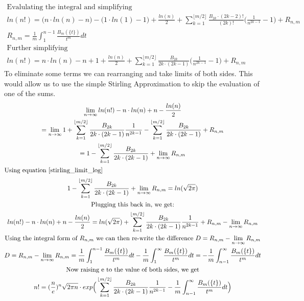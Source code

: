\documentclass[a4paper]{article}
\begin{document}
\begin{theorem}
\begin{gather*}
\\
\text{Evalulating the integral and simplifying}
\\
ln(n!) = \big(n \cdot ln(n) - n \big) - \big(1 \cdot ln(1) - 1 \big) +
\frac{ln(n)}{2} 
+ \sum_{k=1}^{\lfloor m/2 \rfloor} \frac{B_{2k} \cdot (2k-2)!}{(2k)!} \Big(\frac{1}{n^{2k-1}} - 1\Big) + R_{n,m}
\\
R_{n,m} = \frac{1}{m} \int_{1}^{n-1} \frac{B_m(\{t\})}{t^m}  dt
\\
\text{Further simplifying}
\\
ln(n!) = n \cdot ln(n) - n  + 1 +
\frac{ln(n)}{2} 
+ \sum_{k=1}^{\lfloor m/2 \rfloor} \frac{B_{2k}}{2k \cdot (2k-1)} \Big(\frac{1}{n^{2k-1}} - 1\Big) + R_{n,m}
\end{gather*}
To eliminate some terms we can rearranging and take limits of both sides. This would allow us to use the simple Stirling Approximation to skip the evaluation of one of the sums.
\begin{gather*}
\lim_{n \to \infty}
ln(n!)  - n \cdot ln(n) + n - \frac{ln(n)}{2} 
\\
= \lim_{n \to \infty}
1 + \sum_{k=1}^{\lfloor m/2 \rfloor} \frac{B_{2k}}{2k \cdot (2k-1)} \frac{1}{n^{2k-1}}
- \sum_{k=1}^{\lfloor m/2 \rfloor} \frac{B_{2k}}{2k \cdot (2k-1)}
+ R_{n,m}
\\
= 1 - \sum_{k=1}^{\lfloor m/2 \rfloor} \frac{B_{2k}}{2k \cdot (2k-1)}
+ \lim_{n \to \infty} R_{n,m}
\\
\intertext{Using equation \ref{stirling_limit_log}}
1 - \sum_{k=1}^{\lfloor m/2 \rfloor} \frac{B_{2k}}{2k \cdot (2k-1)} + \lim_{n \to \infty} R_{n,m}
= ln(\sqrt{2\pi})
\\
\text{Plugging this back in, we get:}
\\
ln(n!)  - n \cdot ln(n) + n - \frac{ln(n)}{2} 
= ln(\sqrt{2\pi}) + \sum_{k=1}^{\lfloor m/2 \rfloor} \frac{B_{2k}}{2k \cdot (2k-1)} \frac{1}{n^{2k-1}}
+ R_{n,m} - \lim_{n \to \infty} R_{n,m}
\\
\text{Using the integral form of $R_{n,m}$ we can then re-write the difference } 
D = R_{n,m} - \lim_{n \to \infty} R_{n,m}
\\
D = R_{n,m} - \lim_{n \to \infty} R_{n,m} 
= 
\frac{1}{m} \int_{1}^{n-1} \frac{B_m(\{t\})}{t^m}  dt
- 
\frac{1}{m} \int_{1}^{\infty} \frac{B_m(\{t\})}{t^m}  dt
= 
- \frac{1}{m} \int_{n-1}^{\infty} \frac{B_m(\{t\})}{t^m}  dt
\\
\text{Now raising e to the value of both sides, we get}
\\
n! = (\frac{n}{e})^n \sqrt{2\pi n} \cdot
exp \Big( \sum_{k=1}^{\lfloor m/2 \rfloor} \frac{B_{2k}}{2k \cdot (2k-1)} \frac{1}{n^{2k-1}} - \frac{1}{m} \int_{n-1}^{\infty} \frac{B_m(\{t\})}{t^m}  dt \Big)
\end{gather*}
\end{theorem}
\end{document}
